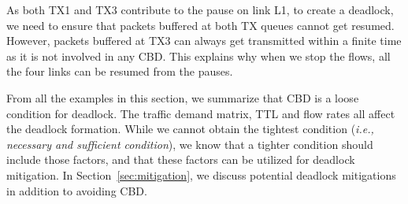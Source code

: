 As both TX1 and TX3 contribute to the pause on link L1, to create a deadlock, we need to ensure that
packets buffered at both TX queues cannot get resumed. However, packets buffered at TX3 can always get
transmitted within a finite time as it is not involved in any CBD. This explains
why when we stop the flows, all the four links can be resumed from the pauses.
\fi


 From all the examples in this section, we summarize that CBD is
 a loose condition for deadlock. The traffic demand matrix, TTL and flow rates all affect the deadlock
 formation. While we cannot obtain the tightest condition ({\em i.e., necessary and sufficient condition}),
we know that a tighter condition should include those factors, and that these factors can be utilized
for deadlock mitigation. In Section~\ref{sec:mitigation}, we discuss potential deadlock mitigations in
addition to avoiding CBD.

